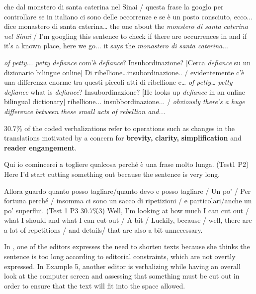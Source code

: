 \documentclass[output=paper]{LSP/langsci}
\begin{document}
% 

\ea \label{troqe-marchan:ex:2}%
\glt che dal monstero di santa caterina nel Sinai / questa frase la googlo per controllare se in italiano ci sono delle occorrenze e se è un posto consciuto, ecco... dice monastero di santa caterina\ldots
\glt the one about the \textit{monstero di santa caterina nel Sinai} / I'm googling this sentence to check if there are occurrences in  and if it's a known place, here we go... it says the \textit{monastero di santa caterina}...
\z 

\ea \label{troqe-marchan:ex:3} 
\glt \textit{of petty}\textit{... petty defiance} com'è \textit{defiance}? Insubordinazione? [Cerca \textit{defiance} su un dizionario bilingue online] Di ribellione\ldots  insubordinazione.. / evidentemente c'è una differenza enorme tra questi piccoli atti di ribellione e\ldots
\glt \textit{of petty\ldots } \textit{petty defiance} what is \textit{defiance}? Insubordinazione? [He looks up \textit{defiance} in an online bilingual dictionary] ribellione... insubbordinazione... / \textit{obviously there'}\textit{s a huge difference between these small acts of rebellion and...}
\z 

30.7\% of the coded verbalizations refer to  operations such as changes in the translations motivated by a concern for \textbf{brevity,} \textbf{clarity,} \textbf{simplification} and \textbf{reader engangement}. 

\ea \label{troqe-marchan:ex:4} 
\glt Qui io comincerei a togliere qualcosa perché è una frase molto lunga. (Test1 P2)
\glt Here I'd start cutting something out because the sentence is very long.
\z 

\ea \label{troqe-marchan:ex:5} 
\glt Allora guardo quanto posso tagliare/quanto devo e posso tagliare / Un po' / Per fortuna perché / insomma ci sono un sacco di ripetizioni / e particolari/anche un po' superflui. (Test 1 P3 30.7\%3)
\glt Well, I'm looking at how much I can cut out / what I should and what I can cut out / A bit / Luckily, because / well, there are a lot of repetitions / and details/ that are also a bit unnecessary. 
\z

In , one of the editors expresses the need to shorten texts because she thinks the sentence is too long according to editorial constraints, which are not overtly expressed. In Example 5, another editor is verbalizing while having an overall look at the computer screen and assessing that something must be cut out in order to ensure that the text will fit  into the space allowed. 
\end{document}
